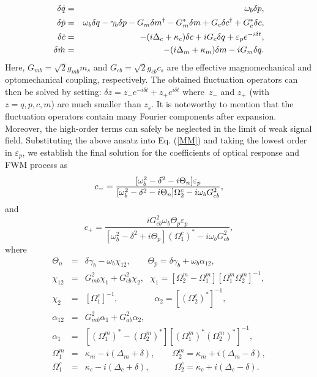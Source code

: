 \documentclass[aps,pra,superscriptaddress,balancelastpage,twocolumn]{revtex4}
\begin{document}
\begin{eqnarray}
\delta \dot{q} &=&\omega _{b}\delta p,  \notag \\%
\delta \dot{p} &=&\omega _{b}\delta q-\gamma _{b}\delta p-G_{m}\delta
m^{\dagger }-G_{m}^{\ast }\delta m +G_{c}\delta c^{\dagger }+G_{c}^{\ast }\delta c, \notag \\
\delta \dot{c} &=&-(i\Delta _{c}+\kappa _{c})\delta c+iG_{c}\delta
q+\varepsilon _{p}e^{-i\delta t}, \notag \\
\delta \dot{m} &=&-(i\Delta _{m}+\kappa _{m})\delta m-iG_{m}\delta q.
\label{MM}
\end{eqnarray}%
Here, $G_{mb}=\sqrt{2}g_{mb}m_{s} $ and $G_{cb}=\sqrt{2}g_{cb}c_{s} $ are the effective magnomechanical and
optomechanical coupling, respectively. The obtained fluctuation operators
can then be solved by setting: $\delta z=z_{-}e^{-i\delta t}+z_{+}e^{i\delta
t}$ where\ $z_{-}$ and $z_{+}$ (with $z=q,p,c,m$) are much smaller than $%
z_{s}$. It is noteworthy to mention that the fluctuation operators contain
many Fourier components after expansion. Moreover, the high-order terms can
safely be neglected in the limit of weak signal field. Substituting the
above ansatz into Eq. (\ref{MM}) and taking the lowest order in $%
\varepsilon _{p}$, we establish the final solution for the coefficients of
optical response and FWM process as
\begin{equation}
c_{-}=\frac{[\omega _{b}^{2}-\delta ^{2}-i\Theta _{n}]\varepsilon _{p}}{%
[\omega _{b}^{2}-\delta ^{2}-i\Theta _{n}]\Omega _{2}^{c}-i\omega
_{b}G_{cb}^{2}},
\end{equation}%
and
\begin{equation}
c_{+}=\frac{iG_{cb}^{2}\omega _{b}\Theta _{p}\varepsilon _{p}}{[\omega
_{b}^{2}-\delta ^{2}+i\Theta _{p}]\left( \Omega _{1}^{c}\right) ^{\ast
}-i\omega _{b}G_{cb}^{2}},
\end{equation}%
where%
\begin{eqnarray*}
\Theta _{n} &=&\delta \gamma _{b}-\omega _{b}\chi _{12},\ \ \ \ \ \ \ \ \
\Theta _{p}=\delta \gamma _{b}+\omega _{b}\alpha _{12}, \\
\chi _{12} &=&G_{mb}^{2}\chi _{1}+G_{cb}^{2}\chi _{2},\ \ \ \chi
_{1}=[\Omega _{2}^{m}-\Omega _{1}^{m}][\Omega _{1}^{m}\Omega _{2}^{m}]^{-1},
\\
\chi _{2} &=&[\Omega _{1}^{c}]^{-1},\ \ \ \ \ \ \ \ \ \ \ \ \ \ \ \ \ \ \
\alpha _{2}=[\left( \Omega _{2}^{c}\right) ^{\ast }]^{-1}, \\
\alpha _{12} &=&G_{mb}^{2}\alpha _{1}+G_{ab}^{2}\alpha _{2}, \\
\alpha _{1} &=&[\left( \Omega _{1}^{m}\right) ^{\ast }-\left( \Omega
_{2}^{m}\right) ^{\ast }][\left( \Omega _{1}^{m}\right) ^{\ast }\left(
\Omega _{2}^{m}\right) ^{\ast }]^{-1}, \\
\Omega _{1}^{m} &=&\kappa _{m}-i(\Delta _{m}+\delta ),\ \ \ \ \ \ \ \ \
\Omega _{2}^{m}=\kappa _{m}+i(\Delta _{m}-\delta ), \\
\Omega _{1}^{c} &=&\kappa _{c}-i(\Delta _{c}+\delta ),\ \ \ \ \ \ \ \ \ \ \
\ \ \Omega _{2}^{c}=\kappa _{c}+i(\Delta _{c}-\delta ).
\end{eqnarray*}
\end{document}

